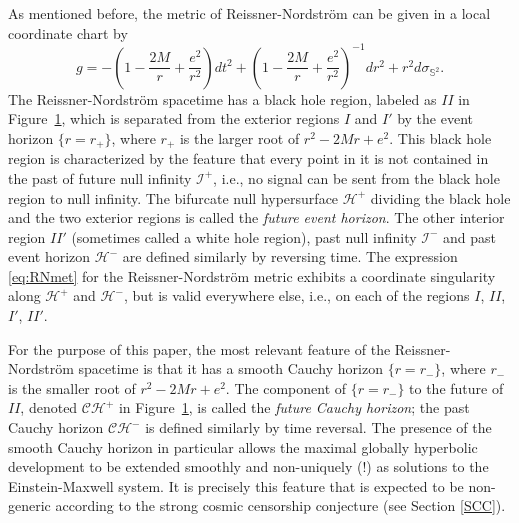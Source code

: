 \documentclass[12 pt, reqno]{amsart}
\theoremstyle{definition}
\theoremstyle{remark}
\numberwithin{equation}{section}
\newcommand{\set}[1]{\{#1\}}
\newcommand{\0}{\emptyset}
\newcommand{\calC}{\mathcal C}
\newcommand{\calH}{\mathcal H}
\newcommand{\calI}{\mathcal I}
\newcommand{\f}{\frac}
\newcommand{\CH}{\calC \calH^{+}}		%
\newcommand{\EH}{\calH^{+}}
\begin{document}
\begin{figure}[h]
\begin{center}
\def\svgwidth{200px}
 
\caption{} \label{fig:RN}
\end{center}
\end{figure}

As mentioned before, the metric of Reissner-Nordstr\"om can be given in a local coordinate chart by
\begin{equation} \label{eq:RNmet}
g=-(1-\f {2M} r+\f{e^2}{r^2})dt^2+(1-\f {2M} r+\f{e^2}{r^2})^{-1} dr^2+r^2 d\sigma_{\mathbb S^2}.
\end{equation}
The Reissner-Nordstr\"om spacetime has a black hole region, labeled as $II$ in Figure~\ref{fig:RN}, which is separated from the exterior regions $I$ and $I'$ by the event horizon $\{r=r_+\}$, where $r_+$ is the larger root of $r^2-2Mr+e^2$. This black hole region is characterized by the feature that every point in it is not contained in the past of future null infinity $\calI^{+}$, i.e., no signal can be sent from the black hole region to null infinity. The bifurcate null hypersurface $\EH$ dividing the black hole and the two exterior regions is called the \emph{future event horizon}. The other interior region $II'$ (sometimes called a white hole region), past null infinity $\calI^{-}$ and past event horizon $\calH^{-}$ are defined similarly by reversing time. The expression \eqref{eq:RNmet} for the Reissner-Nordstr\"om metric exhibits a coordinate singularity along $\EH$ and $\calH^{-}$, but is valid everywhere else, i.e., on each of the regions $I$, $II$, $I'$, $II'$.

For the purpose of this paper, the most relevant feature of the Reissner-Nordstr\"om spacetime is that it has a smooth Cauchy horizon $\{r=r_-\}$, where $r_-$ is the smaller root of $r^2-2Mr+e^2$. The component of $\set{r = r_{-}}$ to the future of $II$, denoted $\CH$ in Figure~\ref{fig:RN}, is called the \emph{future Cauchy horizon}; the past Cauchy horizon $\mathcal{CH}^{-}$ is defined similarly by time reversal. The presence of the smooth Cauchy horizon in particular allows the maximal globally hyperbolic development to be extended smoothly and non-uniquely (!) as solutions to the Einstein-Maxwell system. It is precisely this feature that is expected to be non-generic according to the strong cosmic censorship conjecture (see Section \ref{SCC}).
\end{document}
